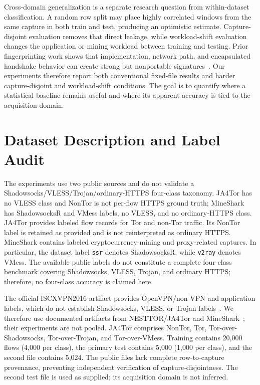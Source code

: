 \documentclass[conference]{IEEEtran}
\begin{document}
Cross-domain generalization is a separate research question from within-dataset classification. A random row split may place highly correlated windows from the same capture in both train and test, producing an optimistic estimate. Capture-disjoint evaluation removes that direct leakage, while workload-shift evaluation changes the application or mining workload between training and testing. Prior fingerprinting work shows that implementation, network path, and encapsulated handshake behavior can create strong but nonportable signatures~\cite{xue}. Our experiments therefore report both conventional fixed-file results and harder capture-disjoint and workload-shift conditions. The goal is to quantify where a statistical baseline remains useful and where its apparent accuracy is tied to the acquisition domain.

\section{Dataset Description and Label Audit}
The experiments use two public sources and do not validate a Shadowsocks/VLESS/Trojan/ordinary-HTTPS four-class taxonomy. JA4Tor has no VLESS class and NonTor is not per-flow HTTPS ground truth; MineShark has ShadowsocksR and VMess labels, no VLESS, and no ordinary-HTTPS class. JA4Tor provides labeled flow records for Tor and non-Tor traffic. Its NonTor label is retained as provided and is not reinterpreted as ordinary HTTPS. MineShark contains labeled cryptocurrency-mining and proxy-related captures. In particular, the dataset label \texttt{ssr} denotes ShadowsocksR, while \texttt{v2ray} denotes VMess. The available public labels do not constitute a complete four-class benchmark covering Shadowsocks, VLESS, Trojan, and ordinary HTTPS; therefore, no four-class accuracy is claimed here.


The official ISCXVPN2016 artifact provides OpenVPN/non-VPN and application labels, which do not establish Shadowsocks, VLESS, or Trojan labels~\cite{gil}. We therefore use documented artifacts from NESTTOR/JA4Tor and MineShark~\cite{nesttor,mineshark}; their experiments are not pooled. JA4Tor comprises NonTor, Tor, Tor-over-Shadowsocks, Tor-over-Trojan, and Tor-over-VMess. Training contains 20,000 flows (4,000 per class), the primary test contains 5,000 (1,000 per class), and the second file contains 5,024. The public files lack complete row-to-capture provenance, preventing independent verification of capture-disjointness. The second test file is used as supplied; its acquisition domain is not inferred.
\end{document}
